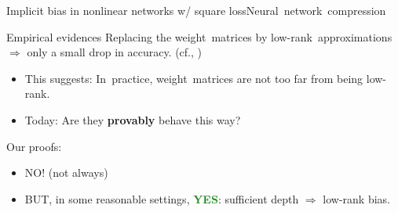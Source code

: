 \documentclass[handout,usenames,dvipsnames]{beamer} %
\newcommand{\true}[1]{{\textcolor{ForestGreen}{\textbf{#1}}}}
\begin{document}
\begin{frame}{Implicit bias in nonlinear networks w/ square loss}{Neural~network~compression}
    \pause
    \begin{exampleblock}{Empirical evidences}
        Replacing the weight~matrices by low-rank~approximations $\Rightarrow$ only a small drop in accuracy.
        \newline \newline
        (cf., \cite{denton2014exploiting,yu2017compressing,alvarez2017compression,arora2018stronger,tukan2020compressed})
    \end{exampleblock}
    \pause
    \begin{itemize}
        \item This suggests: In~practice, weight~matrices are not too far from being low-rank.
        \pause
        \item Today: Are they \textbf{provably} behave this way?
    \end{itemize}
    \pause
    \newline \newline
    Our proofs:
    \begin{itemize}
        \item \alert{NO!} \pause (not always)
        \item BUT, in some reasonable settings, \true{YES}: sufficient depth $\Rightarrow$ low-rank bias.
    \end{itemize}
\end{frame}
\end{document}
